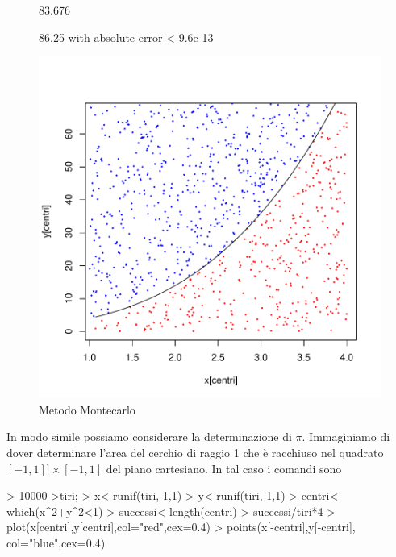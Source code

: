 \documentclass[onecolumn,11pt]{book}
\begin{document}
\begin{figure}[htbp]
\begin{center}
\begin{Schunk}
\begin{Soutput}
[1] 83.676
\end{Soutput}
\begin{Soutput}
86.25 with absolute error < 9.6e-13
\end{Soutput}
\end{Schunk}
\includegraphics{Rmatematica-148}
\caption{Metodo Montecarlo }
\label{fig:Montec1}
\end{center}
\end{figure}

In modo simile possiamo considerare la determinazione di $\pi$. Immaginiamo di dover determinare l'area del cerchio di raggio 1 che \`e racchiuso nel quadrato $[-1,1]]\times[-1,1]$ del piano cartesiano.
In tal caso i comandi sono
\begin{Schunk}
\begin{Sinput}
> 10000->tiri;
> x<-runif(tiri,-1,1)		 
> y<-runif(tiri,-1,1)
> centri<-which(x^2+y^2<1)	 
> successi<-length(centri)
> successi/tiri*4                    
> plot(x[centri],y[centri],col="red",cex=0.4)   
> points(x[-centri],y[-centri], col="blue",cex=0.4)  
\end{Sinput}
\end{Schunk}
\end{document}
